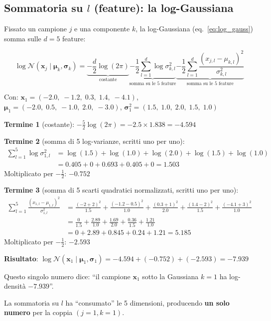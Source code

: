 \documentclass[11pt,a4paper]{article}
\begin{document}
\subsection{Sommatoria su $l$ (feature): la log-Gaussiana}

Fissato un campione $j$ e una componente $k$, la log-Gaussiana (eq.~\eqref{eq:log_gauss}) somma sulle $d=5$ feature:

\begin{equation*}
    \log \mathcal{N}(\mathbf{x}_j\mid\boldsymbol{\mu}_k, \boldsymbol{\sigma}_k) =
    \underbrace{-\frac{d}{2}\log(2\pi)}_{\text{costante}}
    \underbrace{- \frac{1}{2}\sum_{l=1}^{d}\log\sigma_{k,l}^2}_{\text{somma su le 5 feature}}
    \underbrace{- \frac{1}{2}\sum_{l=1}^{d}\frac{(x_{j,l} - \mu_{k,l})^2}{\sigma_{k,l}^2}}_{\text{somma su le 5 feature}}
\end{equation*}

\begin{exbox}[Esempio numerico: $\log\mathcal{N}$ per $j=1$, $k=1$, $d=5$]
Con: $\mathbf{x}_1 = (-2.0,\; -1.2,\; 0.3,\; 1.4,\; -4.1)$, $\boldsymbol{\mu}_1 = (-2.0,\; 0.5,\; -1.0,\; 2.0,\; -3.0)$, $\boldsymbol{\sigma}_1^2 = (1.5,\; 1.0,\; 2.0,\; 1.5,\; 1.0)$

\medskip
\textbf{Termine 1} (costante): $-\frac{5}{2}\log(2\pi) = -2.5 \times 1.838 = -4.594$

\medskip
\textbf{Termine 2} (somma di 5 log-varianze, scritti uno per uno):
\begin{align*}
\sum_{l=1}^{5} \log\sigma_{1,l}^2 &= \log(1.5) + \log(1.0) + \log(2.0) + \log(1.5) + \log(1.0) \\
&= 0.405 + 0 + 0.693 + 0.405 + 0 = 1.503
\end{align*}
Moltiplicato per $-\frac{1}{2}$: $-0.752$

\medskip
\textbf{Termine 3} (somma di 5 scarti quadratici normalizzati, scritti uno per uno):
\begin{align*}
\sum_{l=1}^{5}\frac{(x_{1,l} - \mu_{1,l})^2}{\sigma_{1,l}^2} &= \frac{(-2+2)^2}{1.5} + \frac{(-1.2-0.5)^2}{1.0} + \frac{(0.3+1)^2}{2.0} + \frac{(1.4-2)^2}{1.5} + \frac{(-4.1+3)^2}{1.0} \\
&= \frac{0}{1.5} + \frac{2.89}{1.0} + \frac{1.69}{2.0} + \frac{0.36}{1.5} + \frac{1.21}{1.0} \\
&= 0 + 2.89 + 0.845 + 0.24 + 1.21 = 5.185
\end{align*}
Moltiplicato per $-\frac{1}{2}$: $-2.593$

\medskip
\textbf{Risultato}: $\log\mathcal{N}(\mathbf{x}_1\mid\boldsymbol{\mu}_1, \boldsymbol{\sigma}_1) = -4.594 + (-0.752) + (-2.593) = \mathbf{-7.939}$

\medskip
Questo singolo numero dice: ``il campione $\mathbf{x}_1$ sotto la Gaussiana $k=1$ ha log-densit\`a $-7.939$''.

La sommatoria su $l$ ha ``consumato'' le 5 dimensioni, producendo \textbf{un solo numero} per la coppia $(j=1, k=1)$.
\end{exbox}
\end{document}
